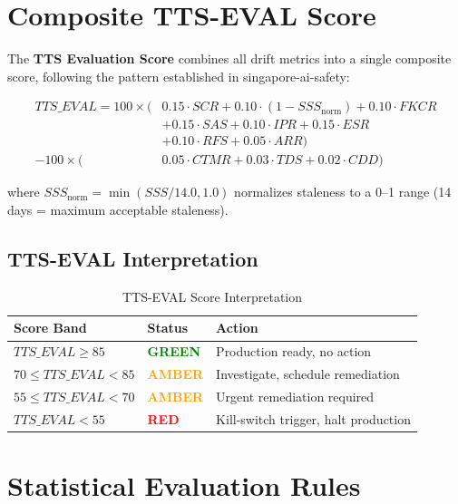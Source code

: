 \section{Composite TTS-EVAL Score}

The \textbf{TTS Evaluation Score} combines all drift metrics into a single
composite score, following the pattern established in singapore-ai-safety:

\begin{equation}
\boxed{
\begin{aligned}
TTS\_EVAL = 100 \times \Big(
  &0.15 \cdot SCR +
  0.10 \cdot (1 - SSS_{\text{norm}}) +
  0.10 \cdot FKCR \\
  &+ 0.15 \cdot SAS +
  0.10 \cdot IPR +
  0.15 \cdot ESR \\
  &+ 0.10 \cdot RFS +
  0.05 \cdot ARR
\Big) \\
- 100 \times \Big(
  &0.05 \cdot CTMR +
  0.03 \cdot TDS +
  0.02 \cdot CDD
\Big)
\end{aligned}
}
\label{eq:tts-eval}
\end{equation}

\noindent where $SSS_{\text{norm}} = \min(SSS / 14.0, 1.0)$ normalizes staleness
to a 0--1 range (14 days = maximum acceptable staleness).

\subsection{TTS-EVAL Interpretation}

\begin{table}[htbp]
\centering
\caption{TTS-EVAL Score Interpretation}
\begin{tabular}{l l l}
\toprule
\textbf{Score Band} & \textbf{Status} & \textbf{Action} \\
\midrule
$TTS\_EVAL \geq 85$ & \textcolor{green}{\textbf{GREEN}} & Production ready, no action \\
$70 \leq TTS\_EVAL < 85$ & \textcolor{orange}{\textbf{AMBER}} & Investigate, schedule remediation \\
$55 \leq TTS\_EVAL < 70$ & \textcolor{orange}{\textbf{AMBER}} & Urgent remediation required \\
$TTS\_EVAL < 55$ & \textcolor{red}{\textbf{RED}} & Kill-switch trigger, halt production \\
\bottomrule
\end{tabular}
\end{table}

\section{Statistical Evaluation Rules}

